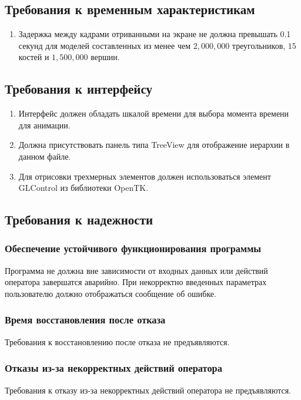 \subsection{Требования к временным характеристикам}
\begin{enumerate}
\item Задержка между кадрами отриванными на экране не должна превышать 0.1 секунд для моделей составленных из менее чем $2,000,000$ треугольников, $15$ костей и  $1,500,000$ вершин.
\end{enumerate}


\subsection{Требования к интерфейсу}
\begin{enumerate}
\item Интерфейс должен обладать шкалой времени для выбора момента времени для анимации.
\item Должна присутствовать панель типа TreeView для отображение иерархии в данном файле.
\item Для отрисовки трехмерных элементов должен использоваться элемент GLControl из библиотеки OpenTK.
\end{enumerate}


\subsection{Требования к надежности}
\subsubsection{Обеспечение устойчивого функционирования программы}
Программа не должна вне зависимости от входных данных или действий оператора завершатся аварийно. При некорректно введенных параметрах пользователю должно отображаться сообщение об ошибке.
\subsubsection{Время восстановления после отказа}
Требования к восстановлению после отказа не предъявляются.
\subsubsection{Отказы из-за некорректных действий оператора}
Требования к отказу из-за некорректных действий оператора не предъявляются.
